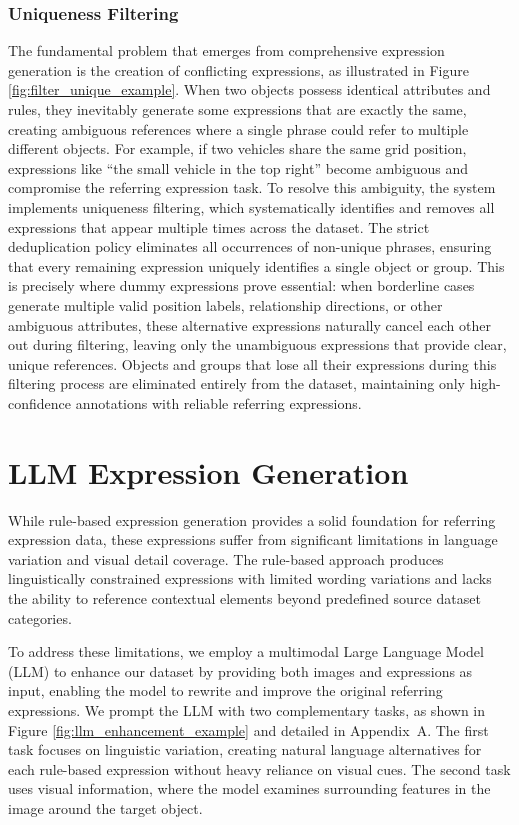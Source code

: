 \subsubsection{Uniqueness Filtering}
The fundamental problem that emerges from comprehensive expression generation is the creation of conflicting expressions, as illustrated in Figure \ref{fig:filter_unique_example}. When two objects possess identical attributes and rules, they inevitably generate some expressions that are exactly the same, creating ambiguous references where a single phrase could refer to multiple different objects. For example, if two vehicles share the same grid position, expressions like ``the small vehicle in the top right'' become ambiguous and compromise the referring expression task. To resolve this ambiguity, the system implements uniqueness filtering, which systematically identifies and removes all expressions that appear multiple times across the dataset. The strict deduplication policy eliminates all occurrences of non-unique phrases, ensuring that every remaining expression uniquely identifies a single object or group. This is precisely where dummy expressions prove essential: when borderline cases generate multiple valid position labels, relationship directions, or other ambiguous attributes, these alternative expressions naturally cancel each other out during filtering, leaving only the unambiguous expressions that provide clear, unique references. Objects and groups that lose all their expressions during this filtering process are eliminated entirely from the dataset, maintaining only high-confidence annotations with reliable referring expressions.


\section{LLM Expression Generation}
\label{subsec:llm_expression_generation}

While rule-based expression generation provides a solid foundation for referring expression data, these expressions suffer from significant limitations in language variation and visual detail coverage. The rule-based approach produces linguistically constrained expressions with limited wording variations and lacks the ability to reference contextual elements beyond predefined source dataset categories.

To address these limitations, we employ a multimodal Large Language Model (LLM) to enhance our dataset by providing both images and expressions as input, enabling the model to rewrite and improve the original referring expressions. We prompt the LLM with two complementary tasks, as shown in Figure \ref{fig:llm_enhancement_example} and detailed in Appendix~A. The first task focuses on linguistic variation, creating natural language alternatives for each rule-based expression without heavy reliance on visual cues. The second task uses visual information, where the model examines surrounding features in the image around the target object.

